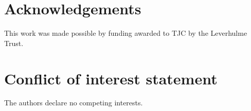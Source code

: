 \documentclass[10pt]{article} %
\begin{document}
\section{Acknowledgements}
 This work was made possible by funding awarded to TJC by the Leverhulme Trust.

\section{Conflict of interest statement}
The authors declare no competing interests.

\FloatBarrier

\printbibliography
\end{document}
